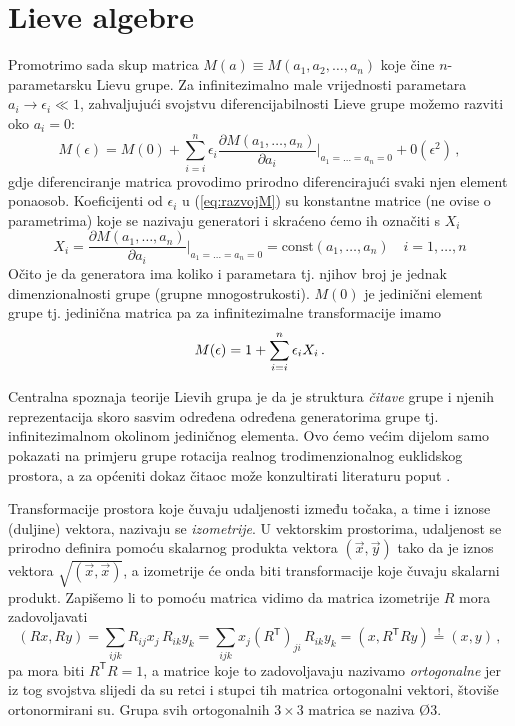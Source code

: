 \section{Lieve algebre}
\label{sec:lievealgebre}

Promotrimo sada skup matrica $M(a)\equiv M(a_1, a_2, \ldots, a_n)$ koje
čine $n$-pa\-ra\-me\-tar\-sku Lievu grupe.
Za infinitezimalno male vrijednosti parametara $a_i \to \epsilon_i \ll 1$, zahvaljujući
svojstvu diferencijabilnosti Lieve grupe možemo razviti oko $a_i = 0$:
\begin{equation}
   M(\epsilon)=M(0)+ \sum_{i=i}^{n}\epsilon_i \frac{\partial M(a_1, \ldots, a_n)}
 {\partial a_i}\Bigg|_{a_1=\ldots =a_n=0} + 0(\epsilon^2) \,,
 \label{eq:razvojM}
\end{equation}
gdje diferenciranje matrica provodimo prirodno diferencirajući svaki njen
element ponaosob. Koeficijenti od $\epsilon_i$ u (\ref{eq:razvojM}) su
konstantne matrice (ne ovise o parametrima) koje se nazivaju generatori
i skraćeno ćemo ih označiti s $X_i$
\begin{equation}
X_i =  \frac{\partial M(a_1, \ldots, a_n)}
 {\partial a_i}\Bigg|_{a_1=\ldots =a_n=0} = \textrm{const}(a_1, \ldots, a_n)
   \quad i=1, \ldots, n 
   \label{eq:defXi}
\end{equation}
Očito je da generatora ima koliko i parametara tj. njihov broj je jednak
dimenzionalnosti grupe (grupne mnogostrukosti).  $M(0)$ je jedinični
element grupe tj. jedinična matrica pa za infinitezimalne transformacije imamo
\begin{equation}
  M(\epsilon)=1 + \sum_{i=i}^{n}\epsilon_i X_i \,. 
\end{equation}

Centralna spoznaja teorije Lievih grupa je da je struktura \emph{čitave} grupe i
njenih reprezentacija skoro sasvim određena
određena generatorima grupe tj. infinitezimalnom okolinom jediničnog 
elementa.
Ovo ćemo većim dijelom samo pokazati na primjeru grupe rotacija realnog
trodimenzionalnog euklidskog prostora, a za općeniti
dokaz čitaoc može konzultirati literaturu poput \cite{Stilwell:2008}.

Transformacije prostora koje čuvaju udaljenosti između točaka, a time
i iznose (duljine) vektora, nazivaju se \emph{izometrije}. U vektorskim prostorima,
udaljenost se prirodno definira pomoću skalarnog produkta vektora $(\vec{x}, \vec{y})$
tako da je iznos vektora $\sqrt{(\vec{x}, \vec{x})}$,
a izometrije će onda biti transformacije koje čuvaju skalarni produkt. Zapišemo
li to pomoću matrica vidimo da matrica izometrije $R$ mora zadovoljavati
\begin{equation}
    (Rx, Ry) = \sum_{ijk} R_{ij}x_{j} \, R_{ik} y_{k} = \sum_{ijk} x_{j} (R^\mathsf{T})_{ji}
    \, R_{ik} y_{k} = (x, R^{\mathsf{T}} R y) \stackrel{!}{=} (x, y) \,,
\end{equation}
pa mora biti $R^{\mathsf{T}} R = 1$, a matrice koje to zadovoljavaju
nazivamo \emph{ortogonalne} jer iz tog svojstva slijedi da su retci i stupci
tih matrica ortogonalni vektori, štoviše ortonormirani su. Grupa svih
ortogonalnih $3 \times 3$ matrica se naziva \O{3}.

